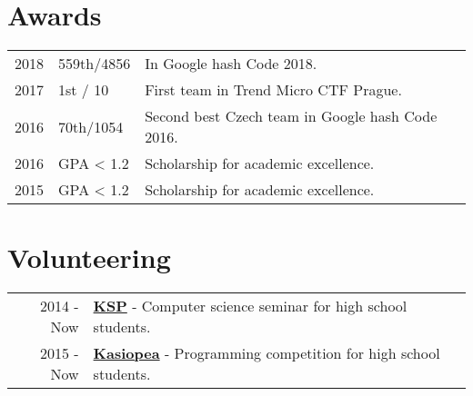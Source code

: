 \documentclass[a4paper]{deedy-resume} %
\begin{document}
\begin{minipage}[t]{0.66\textwidth}
\sectionspace %


\section{Awards} 

\begin{tabular}{rll}
2018 & 559th/4856 & In Google hash Code 2018. \\
2017 & 1st / 10 & First team in Trend Micro CTF Prague. \\
2016 & 70th/1054 & Second best Czech team in Google hash Code 2016. \\
2016 & GPA < 1.2 & Scholarship for academic excellence. \\
2015 & GPA < 1.2 & Scholarship for academic excellence. \\
\end{tabular}

\sectionspace %


\section{Volunteering} 

\begin{tabular}{rll}
2014 - Now & \href{https://ksp.mff.cuni.cz/}{\bf KSP} - Computer science seminar for high school students. \\
2015 - Now & \href{https://kasiopea.matfyz.cz/}{\bf Kasiopea} - Programming competition for high school students. \\
\end{tabular}

\sectionspace %


\end{minipage} %

\end{document}
